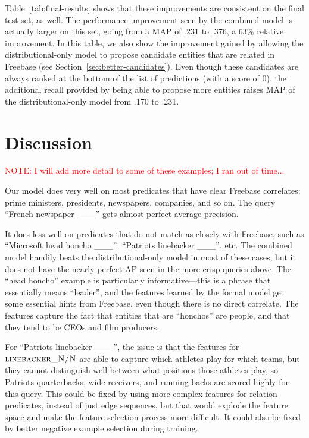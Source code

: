 \documentclass[11pt]{article}
\newcommand{\secref}[1]{Section~\ref{sec:#1}}
\newcommand{\tabref}[1]{Table~\ref{tab:#1}}
\newcommand{\mattnote}[1]{\textcolor{red}{NOTE: #1}}
\newcommand{\blank}{\_\_\_}
\newcommand{\predicate}[1]{\ensuremath{\textsc{#1}}}
\begin{document}
\tabref{final-results} shows that these improvements are consistent on the
final test set, as well.  The performance improvement seen by the combined
model is actually larger on this set, going from a MAP of .231 to .376, a 63\%
relative improvement.  In this table, we also show the improvement gained by
allowing the distributional-only model to propose candidate entities that are
related in Freebase (see \secref{better-candidates}).  Even though these
candidates are always ranked at the bottom of the list of predictions (with a
score of 0), the additional recall provided by being able to propose more
entities raises MAP of the distributional-only model from .170 to .231.

\section{Discussion}
\label{sec:discussion}

\mattnote{I will add more detail to some of these examples; I ran out of
time...}

Our model does very well on most predicates that have clear Freebase
correlates: prime ministers, presidents, newspapers, companies, and so on.  The
query ``French newspaper \blank{}'' gets almost perfect average precision.

It does less well on predicates that do not match as closely with Freebase,
such as ``Microsoft head honcho \blank{}'', ``Patriots linebacker \blank{}'',
etc.  The combined model handily beats the distributional-only model in most of
these cases, but it does not have the nearly-perfect AP seen in the more crisp
queries above.  The ``head honcho'' example is particularly informative---this
is a phrase that essentially means ``leader'', and the features learned by the
formal model get some essential hints from Freebase, even though there is no
direct correlate.  The features capture the fact that entities that are
``honchos'' are people, and that they tend to be CEOs and film producers.

For ``Patriots linebacker \blank{}'', the issue is that the features for
\predicate{linebacker\_N/N} are able to capture which athletes play for which
teams, but they cannot distinguish well between what positions those athletes
play, so Patriots quarterbacks, wide receivers, and running backs are scored
highly for this query.  This could be fixed by using more complex features for
relation predicates, instead of just edge sequences, but that would explode the
feature space and make the feature selection process more difficult.  It could
also be fixed by better negative example selection during training.
\end{document}
